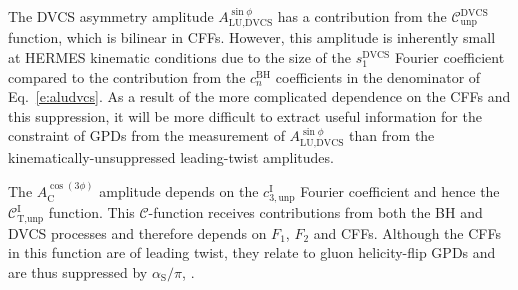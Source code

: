 The DVCS asymmetry amplitude $A^{\sin\phi}_{\textrm{LU,DVCS}}$ has a
contribution from the $\mathcal{C}_{\textrm{unp}}^{\textrm{DVCS}}$ function,
which is bilinear in CFFs. However, this amplitude is inherently small at HERMES kinematic conditions due to the size of the $s_{1}^{\textrm{DVCS}}$ Fourier coefficient compared to the contribution from the $c_{n}^{\textrm{BH}}$ coefficients in the denominator of Eq.~\ref{e:aludvcs}. As a result of
the more complicated dependence on the CFFs and this suppression, it
will be more difficult to extract useful information for the constraint of GPDs
from the measurement of $A^{\sin\phi}_{\textrm{LU,DVCS}}$ than from the
kinematically-unsuppressed leading-twist amplitudes.

The $A^{\cos(3\phi)}_{\textrm{C}}$ amplitude depends on the
$c_{3,\textrm{unp}}^{\textrm{I}}$ Fourier coefficient and hence the
$\mathcal{C}_{\textrm{T,unp}}^{\textrm{I}}$ function. This
$\mathcal{C}$-function receives contributions from both the BH and DVCS
processes and therefore depends on $F_{1}$, $F_{2}$ and CFFs. Although the CFFs
in this function are of leading twist, they relate to gluon helicity-flip GPDs and are thus suppressed by $\alpha_{\textrm{S}}/\pi$,
.
